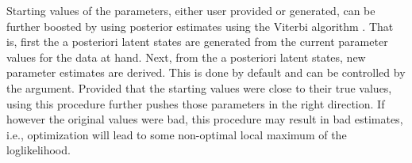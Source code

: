 Starting values of the parameters, either user provided or generated,
can be further boosted by using posterior estimates using the Viterbi
algorithm \cite{Rabiner1989}.  That is, first the a posteriori latent
states are generated from the current parameter values for the data at
hand.  Next, from the a posteriori latent states, new parameter
estimates are derived.  This is done by default and can be controlled
by the  argument.  Provided that the starting values were
close to their true values, using this procedure further pushes those
parameters in the right direction.  If however the original values
were bad, this procedure may result in bad estimates, i.e.,
optimization will lead to some non-optimal local maximum of the
loglikelihood.



